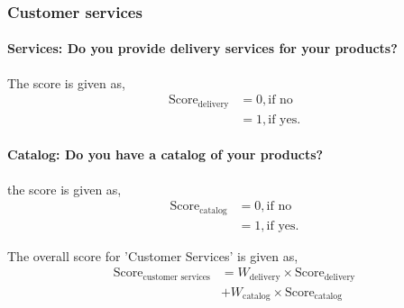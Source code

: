 \documentclass[oneside,twocolumn]{article}
\newcommand{\tsub}[2]{\text{#1}_{\text{#2}}}
\newcommand{\tsubb}[2]{#1_{\text{#2}}}
\begin{document}
\subsubsection{Customer services}
\paragraph{Services: Do you provide delivery services for your products?}
The score is given as,
\begin{align*}
	\tsub{Score}{delivery} &= 0, \text{if no} \\
	&= 1, \text{if yes}.
\end{align*}
\paragraph{Catalog: Do you have a catalog of your products?}
the score is given as,
\begin{align*}
	\tsub{Score}{catalog} &= 0, \text{if no} \\
	&= 1, \text{if yes}.
\end{align*}

The overall score for 'Customer Services' is given as,
\begin{align*}
	\tsub{Score}{customer services} &= \tsubb{W}{delivery} \times \tsub{Score}{delivery} \\
	&+ \tsubb{W}{catalog} \times \tsub{Score}{catalog}
\end{align*}
\end{document}
